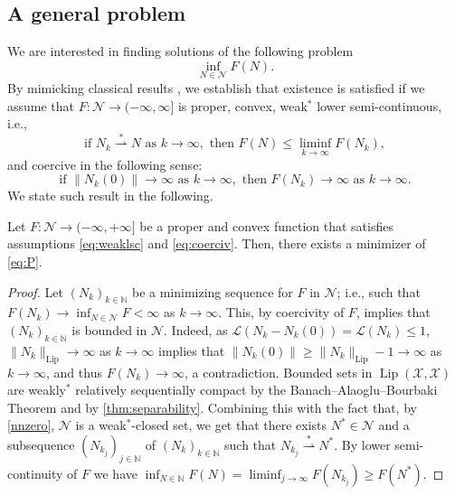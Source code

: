 \documentclass[onefignum,onetabnum]{siamonline250211}
\newcommand{\Lip}{\operatorname{Lip}}
\newcommand{\N}{\mathcal{N}}
\newcommand{\weakk}{\stackrel{\ast}{\rightharpoonup}}
\newcommand{\cX}{\mathcal{X}}
\begin{document}
\subsection{A general problem}\label{problem} We are interested in finding solutions of the following problem 
\begin{equation}\label{eq:P}
\tag{P}
    \inf_{N\in \N}F(N).
\end{equation}
By mimicking classical results \cite{BCombettes}, we establish that existence is satisfied if we assume that $F:\N\to (-\infty,\infty]$ is proper, convex, weak$^*$ lower semi-continuous, i.e., 
\begin{equation}\label{eq:weaklsc}
    \text{if } N_k\weakk N \text{ as } k\to\infty, \text{ then } F(N)\leq\liminf_{k\to\infty}F(N_k),
\end{equation}
and coercive in the following sense: 
\begin{equation}\label{eq:coerciv}
\text{if } \|N_k(0)\|\to\infty \text{ as } k\to\infty, \text{ then } F(N_k)\to\infty \text{ as } k\to\infty.
\end{equation}
We state such result in the following.
\begin{theorem}
\label{thm:existence}
Let $F:\N\to(-\infty, +\infty]$ be a proper and convex function that satisfies assumptions \cref{eq:weaklsc} and \cref{eq:coerciv}. Then, there exists a minimizer of \cref{eq:P}.
\end{theorem}

\begin{proof} Let $(N_k)_{k\in\mathbb{N}}$ be a minimizing sequence for $F$ in $\N$; i.e., such that $F(N_k) \to \inf_{N\in \N} F < \infty$ as $k\to\infty$. This, by coercivity of $F$, implies that $(N_k)_{k\in \mathbb{N}}$ is bounded in $\N$. Indeed, as $\mathcal{L}(N_k-N_k(0))= \mathcal{L}(N_k)\leq 1$, $\|N_k\|_{\Lip}\to\infty$ as $k\to\infty$ implies that $\|N_{k}(0)\|\geq\|N_k\|_{\Lip}-1\to \infty$ as $k\to\infty$, and thus $F(N_{k})\to \infty$, a contradiction. Bounded sets in $\Lip(\cX, \cX)$ are weakly$^*$ relatively sequentially compact by the Banach--Alaoglu--Bourbaki Theorem and by \cref{thm:separability}. Combining this with the fact that, by \cref{nnzero}, $\N$ is a weak$^*$-closed set, we get that there exists $N^*\in \N$ and a subsequence $(N_{k_j})_{j\in \mathbb{N}}$ of $(N_k)_{k\in \mathbb{N}}$ such that $N_{k_j} \weakk N^*$. By lower semi-continuity of $F$ we have $\inf_{N\in \mathbb{N}} F(N)=\liminf_{j\to \infty} F(N_{k_j}) \geq F(N^*) $.
\end{proof}
\end{document}
